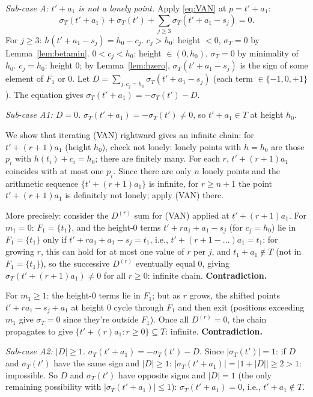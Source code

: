 \emph{Sub-case A: $t'+a_1$ is not a lonely point.}
Apply \eqref{eq:VAN} at $p=t'+a_1$:
\[
  \sigma_T(t'+a_1)+\sigma_T(t')+\sum_{j\ge3}\sigma_T(t'+a_1-s_j)=0.
\]
For $j\ge3$: $h(t'+a_1-s_j)=h_0-c_j$.
$c_j>h_0$: height $<0$, $\sigma_T=0$ by Lemma~\ref{lem:betamin}.
$0<c_j<h_0$: height $\in(0,h_0)$, $\sigma_T=0$ by minimality of $h_0$.
$c_j=h_0$: height $0$; by Lemma~\ref{lem:hzero}, $\sigma_T(t'+a_1-s_j)$
is the sign of some element of $F_1$ or $0$.
Let $D=\sum_{j:c_j=h_0}\sigma_T(t'+a_1-s_j)$ (each term $\in\{-1,0,+1\}$).
The equation gives $\sigma_T(t'+a_1)=-\sigma_T(t')-D$.

\medskip\noindent\textit{Sub-case A1: $D=0$.}
$\sigma_T(t'+a_1)=-\sigma_T(t')\ne0$, so $t'+a_1\in T$ at height $h_0$.

We show that iterating (VAN) rightward gives an infinite chain:
for $t'+(r+1)a_1$ (height $h_0$), check not lonely: lonely points with
$h=h_0$ are those $p_i$ with $h(t_i)+c_i=h_0$; there are finitely many.
For each $r$, $t'+(r+1)a_1$ coincides with at most one $p_i$.
Since there are only $n$ lonely points and the arithmetic sequence
$\{t'+(r+1)a_1\}$ is infinite, for $r\ge n+1$ the point $t'+(r+1)a_1$
is definitely not lonely; apply (VAN) there.

More precisely: consider the $D^{(r)}$ sum for (VAN) applied at $t'+(r+1)a_1$.
For $m_1=0$: $F_1=\{t_1\}$, and the height-$0$ terms $t'+ra_1+a_1-s_j$
(for $c_j=h_0$) lie in $F_1=\{t_1\}$ only if $t'+ra_1+a_1-s_j=t_1$,
i.e., $t'+(r+1-...)a_1=t_1$: for growing $r$, this can hold for at most
one value of $r$ per $j$, and $t_1+a_1\notin T$ (not in $F_1=\{t_1\}$),
so the successive $D^{(r)}$ eventually equal $0$, giving
$\sigma_T(t'+(r+1)a_1)\ne 0$ for all $r\ge 0$: infinite chain.  \textbf{Contradiction.}

For $m_1\ge 1$: the height-$0$ terms lie in $F_1$; but as $r$ grows,
the shifted points $t'+ra_1-s_j+a_1$ at height $0$ cycle through $F_1$
and then exit (positions exceeding $m_1$ give $\sigma_T=0$ since they're
outside $F_1$).  Once all $D^{(r)}=0$, the chain propagates to give
$\{t'+(r)a_1:r\ge0\}\subseteq T$: infinite.  \textbf{Contradiction.}

\medskip\noindent\textit{Sub-case A2: $|D|\ge 1$.}
$\sigma_T(t'+a_1)=-\sigma_T(t')-D$.
Since $|\sigma_T(t')|=1$:
if $D$ and $\sigma_T(t')$ have the same sign and $|D|\ge 1$:
$|\sigma_T(t'+a_1)|=|1+|D||\ge 2>1$: impossible.
So $D$ and $\sigma_T(t')$ have opposite signs and $|D|=1$ (the only remaining
possibility with $|\sigma_T(t'+a_1)|\le 1$):
$\sigma_T(t'+a_1)=0$, i.e., $t'+a_1\notin T$.

